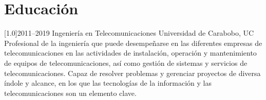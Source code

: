 \documentclass[espanol]{cv-style}     %
\begin{document}
\section{Educación}
  \vspace{-0.2cm}
\begin{entrylist}
\entry
{\scalebox{.8}[1.0]{2011--2019}}
{Ingeniería en Telecomunicaciones}
{Universidad de Carabobo, UC}
{\textbf{}
\\
\small{Profesional de la ingeniería que puede desempeñarse en las diferentes empresas de telecomunicaciones en las actividades de instalación, operación y mantenimiento de equipos de telecomunicaciones, así como gestión de sistemas y servicios de telecomunicaciones. Capaz de resolver problemas y gerenciar proyectos de diversa índole y alcance, en los que las tecnologías de la información y las telecomunicaciones son un elemento clave.}}
\end{entrylist}
\end{document}
